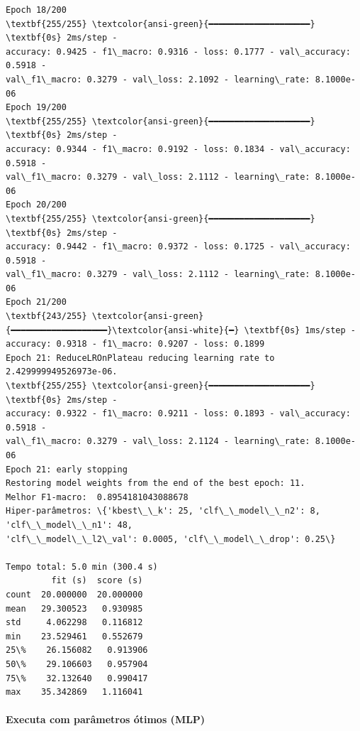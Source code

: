 \documentclass[11pt]{article}
\begin{document}
\begin{Verbatim}[commandchars=\\\{\}]
Epoch 18/200
\textbf{255/255} \textcolor{ansi-green}{━━━━━━━━━━━━━━━━━━━━} \textbf{0s} 2ms/step -
accuracy: 0.9425 - f1\_macro: 0.9316 - loss: 0.1777 - val\_accuracy: 0.5918 -
val\_f1\_macro: 0.3279 - val\_loss: 2.1092 - learning\_rate: 8.1000e-06
Epoch 19/200
\textbf{255/255} \textcolor{ansi-green}{━━━━━━━━━━━━━━━━━━━━} \textbf{0s} 2ms/step -
accuracy: 0.9344 - f1\_macro: 0.9192 - loss: 0.1834 - val\_accuracy: 0.5918 -
val\_f1\_macro: 0.3279 - val\_loss: 2.1112 - learning\_rate: 8.1000e-06
Epoch 20/200
\textbf{255/255} \textcolor{ansi-green}{━━━━━━━━━━━━━━━━━━━━} \textbf{0s} 2ms/step -
accuracy: 0.9442 - f1\_macro: 0.9372 - loss: 0.1725 - val\_accuracy: 0.5918 -
val\_f1\_macro: 0.3279 - val\_loss: 2.1112 - learning\_rate: 8.1000e-06
Epoch 21/200
\textbf{243/255} \textcolor{ansi-green}{━━━━━━━━━━━━━━━━━━━}\textcolor{ansi-white}{━} \textbf{0s} 1ms/step -
accuracy: 0.9318 - f1\_macro: 0.9207 - loss: 0.1899
Epoch 21: ReduceLROnPlateau reducing learning rate to 2.429999949526973e-06.
\textbf{255/255} \textcolor{ansi-green}{━━━━━━━━━━━━━━━━━━━━} \textbf{0s} 2ms/step -
accuracy: 0.9322 - f1\_macro: 0.9211 - loss: 0.1893 - val\_accuracy: 0.5918 -
val\_f1\_macro: 0.3279 - val\_loss: 2.1124 - learning\_rate: 8.1000e-06
Epoch 21: early stopping
Restoring model weights from the end of the best epoch: 11.
Melhor F1‑macro:  0.8954181043088678
Hiper‑parâmetros: \{'kbest\_\_k': 25, 'clf\_\_model\_\_n2': 8, 'clf\_\_model\_\_n1': 48,
'clf\_\_model\_\_l2\_val': 0.0005, 'clf\_\_model\_\_drop': 0.25\}

Tempo total: 5.0 min (300.4 s)
         fit (s)  score (s)
count  20.000000  20.000000
mean   29.300523   0.930985
std     4.062298   0.116812
min    23.529461   0.552679
25\%    26.156082   0.913906
50\%    29.106603   0.957904
75\%    32.132640   0.990417
max    35.342869   1.116041
    \end{Verbatim}

    \hypertarget{executa-com-paruxe2metros-uxf3timos-mlp}{%
\paragraph{Executa com parâmetros ótimos
(MLP)}\label{executa-com-paruxe2metros-uxf3timos-mlp}}
\end{document}
